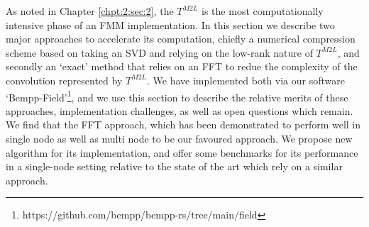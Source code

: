 As noted in Chapter \ref{chpt:2:sec:2}, the $T^{M2L}$ is the most computationally intensive phase of an FMM implementation. In this section we describe two major approaches to accelerate its computation, chiefly a numerical compression scheme based on taking an SVD and relying on the low-rank nature of $T^{M2L}$, and secondly an `exact' method that relies on an FFT to redue the complexity of the convolution represented by $T^{M2L}$. We have implemented both via our software `Bempp-Field'\footnote{https://github.com/bempp/bempp-rs/tree/main/field}, and we use this section to describe the relative merits of these approaches, implementation challenges, as well as open questions which remain. We find that the FFT approach, which has been demonstrated to perform well in single node \cite{wang2021exafmm} as well as multi node \cite{malhotra2015pvfmm} to be our favoured approach. We propose new algorithm for its implementation, and offer some benchmarks for its performance in a single-node setting relative to the state of the art \cite{wang2021exafmm,malhotra2015pvfmm} which rely on a similar approach.


